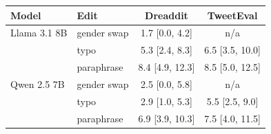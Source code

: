 \begin{tabular}{llcc}
\toprule
Model & Edit & Dreaddit & TweetEval \\
\midrule
Llama 3.1 8B & gender swap & 1.7 [0.0, 4.2] & n/a \\
 & typo & 5.3 [2.4, 8.3] & 6.5 [3.5, 10.0] \\
 & paraphrase & 8.4 [4.9, 12.3] & 8.5 [5.0, 12.5] \\
\midrule
Qwen 2.5 7B & gender swap & 2.5 [0.0, 5.8] & n/a \\
 & typo & 2.9 [1.0, 5.3] & 5.5 [2.5, 9.0] \\
 & paraphrase & 6.9 [3.9, 10.3] & 7.5 [4.0, 11.5] \\
\bottomrule
\end{tabular}
